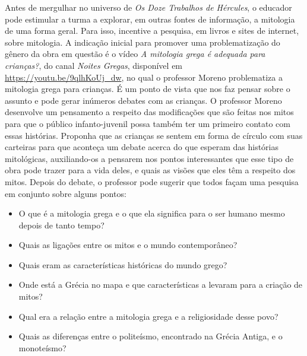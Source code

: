 \documentclass[11pt]{extarticle}
\begin{document}
Antes de mergulhar no universo de \textit{Os Doze Trabalhos de Hércules}, o educador pode estimular a turma a explorar, em outras fontes de informação, a mitologia de uma forma geral. Para isso, incentive a pesquisa, em livros e sites de internet, sobre mitologia. A indicação inicial para promover uma problematização do gênero da obra em questão é o vídeo \textit{A mitologia grega é adequada para crianças?}, do canal \textit{Noites Gregas}, disponível em \url{https://youtu.be/9qlhKoUj_dw}, no qual o professor Moreno problematiza a mitologia grega para crianças. É um ponto de vista que nos faz pensar sobre o assunto e pode gerar inúmeros debates com as crianças. O professor Moreno desenvolve um pensamento a respeito das modificações que são feitas nos mitos para que o público infanto-juvenil possa também ter um primeiro contato com essas histórias. Proponha que as crianças se sentem em forma de círculo com suas carteiras para que aconteça um debate acerca do que esperam das histórias mitológicas, auxiliando-os a pensarem nos pontos interessantes que esse tipo de obra pode trazer para a vida deles, e quais as visões que eles têm a respeito dos mitos. Depois do debate, o professor pode sugerir que todos façam uma pesquisa em conjunto sobre alguns pontos:

\begin{itemize}
\item O que é a mitologia grega e o que ela significa para o ser humano mesmo depois de tanto tempo?
\item Quais as ligações entre os mitos e o mundo contemporâneo?
\item Quais eram as características históricas do mundo grego?
\item Onde está a Grécia no mapa e que características a levaram para a criação de mitos?
\item Qual era a relação entre a mitologia grega e a religiosidade desse povo?
\item Quais as diferenças entre o politeísmo, encontrado na Grécia Antiga, e o monoteísmo? %
\end{itemize}


\end{document}
